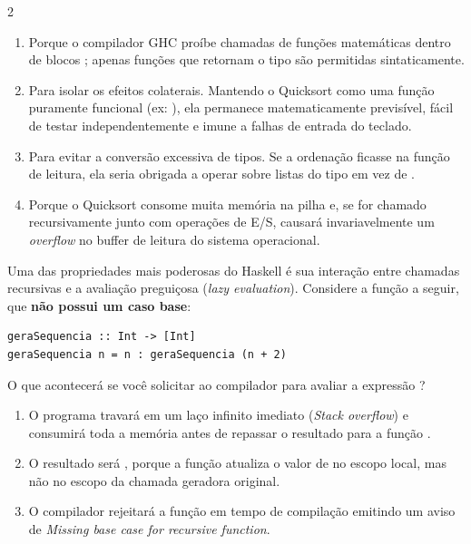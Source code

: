 \documentclass[a4paper,10pt,brazil]{article}
\begin{document}
\begin{multicols}{2}
\begin{enumerate}
  \item Porque o compilador GHC proíbe chamadas de funções matemáticas dentro de blocos ; apenas funções que retornam o tipo  são permitidas sintaticamente.

  \item Para isolar os efeitos colaterais. Mantendo o Quicksort como uma função puramente funcional (ex: \haskellinline{[Int] -> [Int]}), ela permanece matematicamente previsível, fácil de testar independentemente e imune a falhas de entrada do teclado.

  \item Para evitar a conversão excessiva de tipos. Se a ordenação ficasse na função de leitura, ela seria obrigada a operar sobre listas do tipo \haskellinline{[IO Int]} em vez de \haskellinline{[Int]}.

  \item Porque o Quicksort consome muita memória na pilha e, se for chamado recursivamente junto com operações de E/S, causará invariavelmente um \emph{overflow} no buffer de leitura do sistema operacional.


\end{enumerate}

Uma das propriedades mais poderosas do Haskell é sua interação entre chamadas recursivas e a avaliação preguiçosa (\emph{lazy evaluation}). Considere a função a seguir, que \textbf{não possui um caso base}:

\begin{verbatim}
geraSequencia :: Int -> [Int]
geraSequencia n = n : geraSequencia (n + 2)
\end{verbatim}

O que acontecerá se você solicitar ao compilador para avaliar a expressão ?

\begin{enumerate}
  \item O programa travará em um laço infinito imediato (\emph{Stack overflow}) e consumirá toda a memória antes de repassar o resultado para a função .

  \item O resultado será \haskellinline{[10, 10, 10]}, porque a função atualiza o valor de  no escopo local, mas não no escopo da chamada geradora original.

  \item O compilador rejeitará a função  em tempo de compilação emitindo um aviso de \emph{Missing base case for recursive function}.


\end{enumerate}
\end{multicols}
\end{document}
